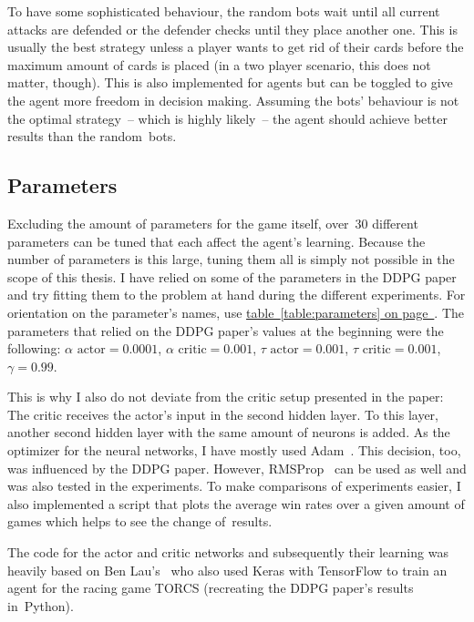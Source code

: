 \documentclass[a4paper,titlepage]{article}
\begin{document}
To have some sophisticated behaviour, the random bots wait until all current attacks are defended or the defender checks until they place another one. This is usually the best strategy unless a player wants to get rid of their cards before the maximum amount of cards is placed (in a two player scenario, this does not matter, though). This is also implemented for agents but can be toggled to give the agent more freedom in decision making. Assuming the bots' behaviour is not the optimal strategy~-- which is highly likely~-- the agent should achieve better results than the random~bots.

\subsection{Parameters}

Excluding the amount of parameters for the game itself, over~30 different parameters can be tuned that each affect the agent's learning.
Because the number of parameters is this large, tuning them all is simply not possible in the scope of this thesis. I have relied on some of the parameters in the DDPG paper~\cite[p.~11]{ddpg} and try fitting them to the problem at hand during the different experiments. For orientation on the parameter's names, use \hyperref[table:parameters]{table~\ref*{table:parameters} on page~\pageref*{table:parameters}}. The parameters that relied on the DDPG paper's values at the beginning were the following: $\alpha \text{~actor} = 0.0001$, $\alpha \text{~critic} = 0.001$, $\tau \text{~actor} = 0.001$, $\tau \text{~critic} = 0.001$, $\gamma = 0.99$.

This is why I also do not deviate from the critic setup presented in the paper: The critic receives the actor's input in the second hidden layer. To this layer, another second hidden layer with the same amount of neurons is added.
As the optimizer for the neural networks, I have mostly used Adam~\cite{adam}. This decision, too, was influenced by the DDPG paper. However, RMSProp~\cite{rmsprop} can be used as well and was also tested in the experiments.
To make comparisons of experiments easier, I also implemented a script that plots the average win rates over a given amount of games which helps to see the change of~results. \medskip

The code for the actor and critic networks and subsequently their learning was heavily based on Ben Lau's~\cite{torcs} who also used Keras with TensorFlow to train an agent for the racing game TORCS (recreating the DDPG paper's results in~Python).
\end{document}
